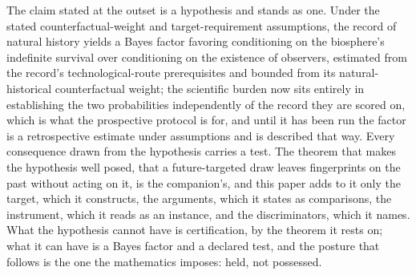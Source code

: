 The claim stated at the outset is a hypothesis and stands as one. Under
the stated counterfactual-weight and target-requirement assumptions, the
record of natural history yields a Bayes factor favoring conditioning on
the biosphere's indefinite survival over conditioning on the existence
of observers, estimated from the record's technological-route
prerequisites and bounded from its natural-historical counterfactual
weight; the scientific burden now sits entirely in establishing the two
probabilities independently of the record they are scored on, which is
what the prospective protocol is for, and until it has been run the
factor is a retrospective estimate under assumptions and is described
that way. Every consequence drawn from the hypothesis carries a test. The theorem that makes the hypothesis well posed, that a
future-targeted draw leaves fingerprints on the past without acting on
it, is the companion's, and this paper adds to it only the target, which
it constructs, the arguments, which it states as comparisons, the
instrument, which it reads as an instance, and the discriminators, which
it names. What the hypothesis cannot have is certification, by the
theorem it rests on; what it can have is a Bayes factor and a declared
test, and the posture that follows is the one the mathematics imposes:
held, not possessed.

\printbibliography
